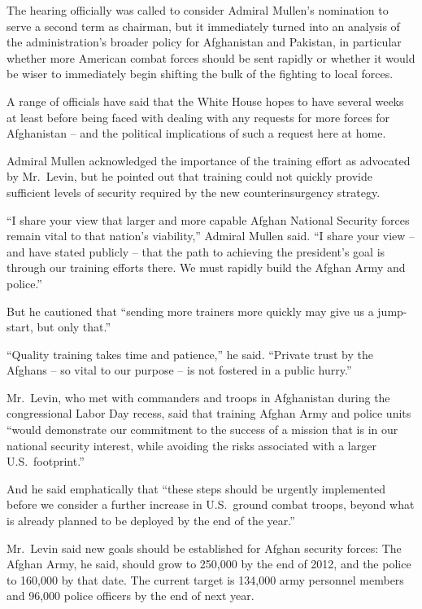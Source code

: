 ﻿\documentclass[12pt]{article}
\begin{document}
The hearing officially was called to consider Admiral Mullen's nomination to serve a second term as
chairman, but it immediately turned into an analysis of the administration's broader policy for
Afghanistan and Pakistan, in particular whether more American combat forces should be sent rapidly
or whether it would be wiser to immediately begin shifting the bulk of the fighting to local forces.

A range of officials have said that the White House hopes to have several weeks at least before
being faced with dealing with any requests for more forces for Afghanistan -- and the political
implications of such a request here at home.

Admiral Mullen acknowledged the importance of the training effort as advocated by Mr.~Levin, but he
pointed out that training could not quickly provide sufficient levels of security required by the
new counterinsurgency strategy.

``I share your view that larger and more capable Afghan National Security forces remain vital to
that nation's viability,'' Admiral Mullen said. ``I share your view -- and have stated publicly --
that the path to achieving the president's goal is through our training efforts there. We must
rapidly build the Afghan Army and police.''

But he cautioned that ``sending more trainers more quickly may give us a jump-start, but only
that.''

``Quality training takes time and patience,'' he said. ``Private trust by the Afghans -- so vital to
our purpose -- is not fostered in a public hurry.''

Mr.~Levin, who met with commanders and troops in Afghanistan during the congressional Labor Day
recess, said that training Afghan Army and police units ``would demonstrate our commitment to the
success of a mission that is in our national security interest, while avoiding the risks associated
with a larger U.S.~footprint.''

And he said emphatically that ``these steps should be urgently implemented before we consider a
further increase in U.S.~ground combat troops, beyond what is already planned to be deployed by the
end of the year.''

Mr.~Levin said new goals should be established for Afghan security forces: The Afghan Army, he said,
should grow to 250,000 by the end of 2012, and the police to 160,000 by that date. The current
target is 134,000 army personnel members and 96,000 police officers by the end of next year.
\end{document}
